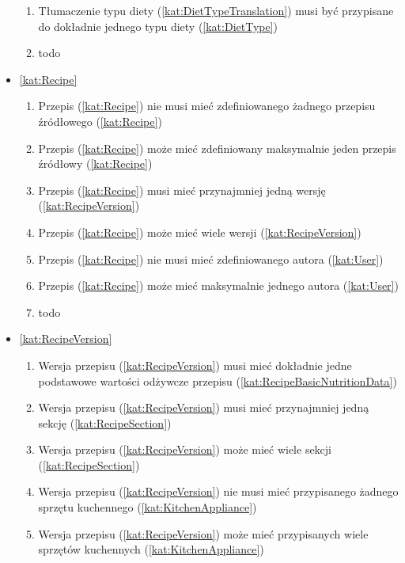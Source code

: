\begin{itemize}[label={\textbf{Reguły dla}}, wide, labelwidth=!, labelindent=0pt]
\begin{enumerate}[label={\textbf{REG/\protect\threedigits{\arabic{enumi}}}}, wide, labelwidth=!, align=left, leftmargin=3cm, resume]
        \item Tłumaczenie typu diety (\ref{kat:DietTypeTranslation}) musi być przypisane do dokładnie jednego typu diety (\ref{kat:DietType})
        \item todo
    \end{enumerate}
    \item\ref{kat:Recipe}
    \begin{enumerate}[label={\textbf{REG/\protect\threedigits{\arabic{enumi}}}}, wide, labelwidth=!, align=left, leftmargin=3cm, resume]
        \item Przepis (\ref{kat:Recipe}) nie musi mieć zdefiniowanego żadnego przepisu źródłowego (\ref{kat:Recipe})
        \item Przepis (\ref{kat:Recipe}) może mieć zdefiniowany maksymalnie jeden przepis źródłowy (\ref{kat:Recipe})
        \item Przepis (\ref{kat:Recipe}) musi mieć przynajmniej jedną wersję (\ref{kat:RecipeVersion})
        \item Przepis (\ref{kat:Recipe}) może mieć wiele wersji (\ref{kat:RecipeVersion})
        \item Przepis (\ref{kat:Recipe}) nie musi mieć zdefiniowanego autora (\ref{kat:User})
        \item Przepis (\ref{kat:Recipe}) może mieć maksymalnie jednego autora (\ref{kat:User})
        \item todo
    \end{enumerate}
    \item\ref{kat:RecipeVersion}
    \begin{enumerate}[label={\textbf{REG/\protect\threedigits{\arabic{enumi}}}}, wide, labelwidth=!, align=left, leftmargin=3cm, resume]
        \item Wersja przepisu (\ref{kat:RecipeVersion}) musi mieć dokładnie jedne podstawowe wartości odżywcze przepisu (\ref{kat:RecipeBasicNutritionData})
        \item Wersja przepisu (\ref{kat:RecipeVersion}) musi mieć przynajmniej jedną sekcję (\ref{kat:RecipeSection})
        \item Wersja przepisu (\ref{kat:RecipeVersion}) może mieć wiele sekcji (\ref{kat:RecipeSection})
        \item Wersja przepisu (\ref{kat:RecipeVersion}) nie musi mieć przypisanego żadnego sprzętu kuchennego (\ref{kat:KitchenAppliance})
        \item Wersja przepisu (\ref{kat:RecipeVersion}) może mieć przypisanych wiele sprzętów kuchennych (\ref{kat:KitchenAppliance})

\end{enumerate}
\end{itemize}
